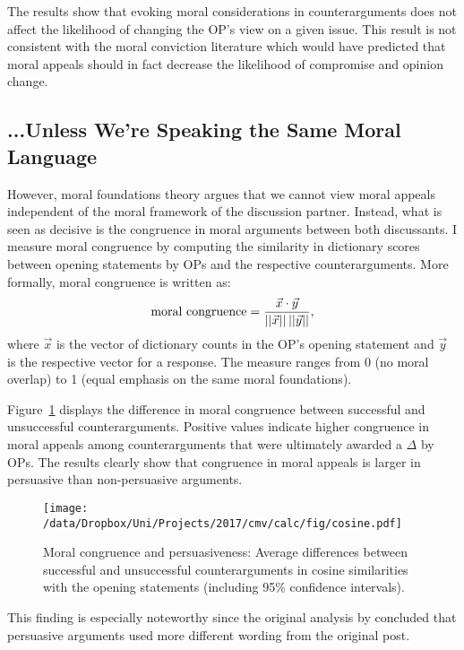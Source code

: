 The results show that evoking moral considerations in counterarguments does not affect the likelihood of changing the OP's view on a given issue. This result is not consistent with the moral conviction literature which would have predicted that moral appeals should in fact decrease the likelihood of compromise and opinion change.


\subsection{...Unless We're Speaking the Same Moral Language}

However, moral foundations theory argues that we cannot view moral appeals independent of the moral framework of the discussion partner. Instead, what is seen as decisive is the congruence in moral arguments between both discussants. I measure moral congruence by computing the similarity in dictionary scores between opening statements by OPs and the respective counterarguments. More formally, moral congruence is written as:
\begin{equation}
\text{moral congruence}=\dfrac{\vec{x}\cdot \vec{y}}{||\vec{x}||\hspace{.2em}||\vec{y}||},
\end{equation}
where $\vec{x}$ is the vector of dictionary counts in the OP's opening statement and $\vec{y}$ is the respective vector for a response. The measure ranges from 0 (no moral overlap) to 1 (equal emphasis on the same moral foundations).

Figure~\ref{fig:cosine} displays the difference in moral congruence between successful and unsuccessful counterarguments. Positive values indicate higher congruence in moral appeals among counterarguments that were ultimately awarded a $\Delta$ by OPs. The results clearly show that congruence in moral appeals is larger in persuasive than non-persuasive arguments.

\begin{figure}[ht]
\centering
\texttt{[image: /data/Dropbox/Uni/Projects/2017/cmv/calc/fig/cosine.pdf]}
\caption[Moral congruence and persuasiveness]{Moral congruence and persuasiveness: Average differences between successful and unsuccessful counterarguments in cosine similarities with the opening statements (including 95\% confidence intervals).}\label{fig:cosine}
\end{figure}

This finding is especially noteworthy since the original analysis by \citet[6]{tan2016winning} concluded that persuasive arguments used more different wording from the original post. %


